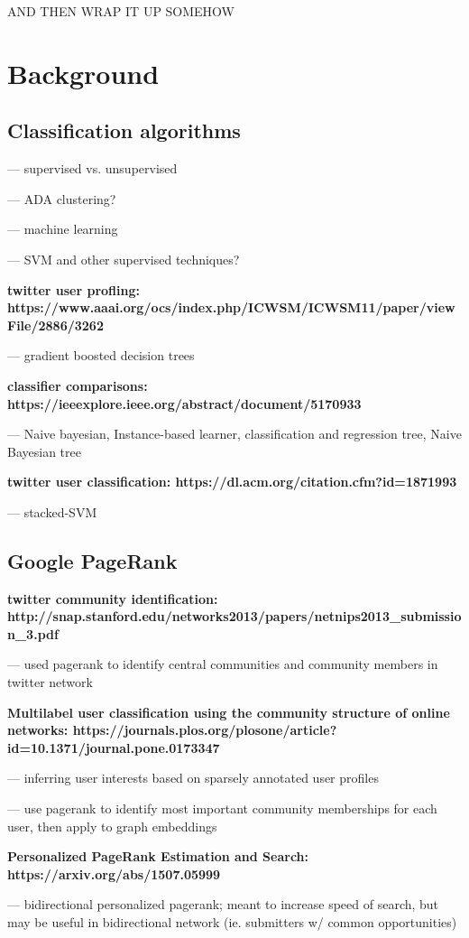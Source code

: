 \documentclass[]{report}   %
\begin{document}
AND THEN WRAP IT UP SOMEHOW

\chapter{Background}
\section{Classification algorithms}

--- supervised vs. unsupervised

--- ADA clustering?

--- machine learning

--- SVM and other supervised techniques?

\textbf{twitter user profling: https://www.aaai.org/ocs/index.php/ICWSM/ICWSM11/paper/viewFile/2886/3262}

--- gradient boosted decision trees

\textbf{classifier comparisons: https://ieeexplore.ieee.org/abstract/document/5170933}

--- Naive bayesian, Instance-based learner, classification and regression tree, Naive Bayesian tree

\textbf{twitter user classification: https://dl.acm.org/citation.cfm?id=1871993}

--- stacked-SVM

\section{Google PageRank}

\textbf{twitter community identification: http://snap.stanford.edu/networks2013/papers/netnips2013\_submission\_3.pdf}

--- used pagerank to identify central communities and community members in twitter network

\textbf{Multilabel user classification using the community structure of online networks: https://journals.plos.org/plosone/article?id=10.1371/journal.pone.0173347}

--- inferring user interests based on sparsely annotated user profiles

--- use pagerank to identify most important community memberships for each user, then apply to graph embeddings

\textbf{Personalized PageRank Estimation and Search: https://arxiv.org/abs/1507.05999}

--- bidirectional personalized pagerank; meant to increase speed of search, but may be useful in bidirectional network (ie. submitters w/ common opportunities)
\end{document}
